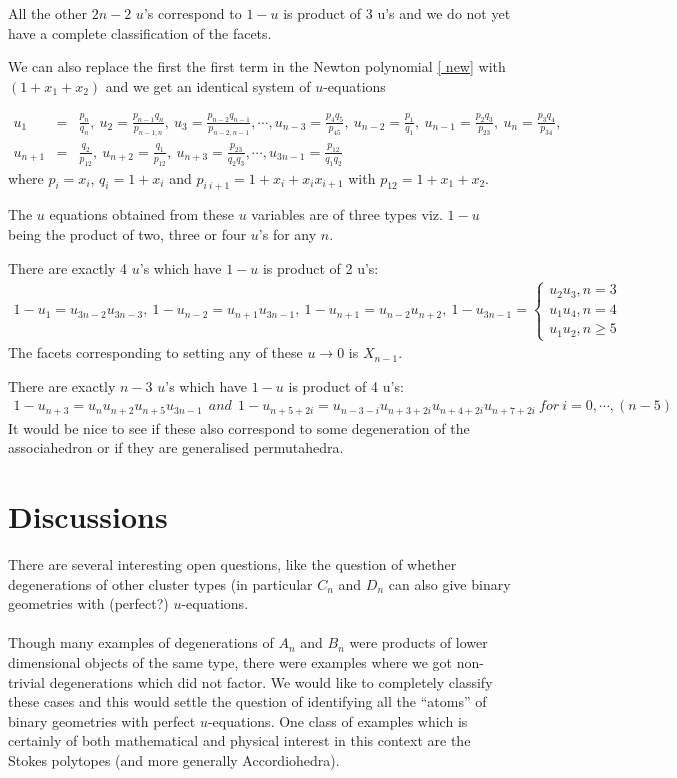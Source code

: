 \documentclass[hidelinks,12pt]{article}
\newcommand{\bea}[1]{\begin{eqnarray}\label{#1} }
\newcommand{\eea}{\end{eqnarray}}
\def\bea{\begin{eqnarray}}
\def\eea{\end{eqnarray}}
\begin{document}
All the other $2n-2$ $u$'s correspond to $1-u$ is product of 3 u's and we do not yet have a complete classification of the facets.

We can also replace the first the first term in the Newton polynomial \eqref{ new} with $(1+x_1+ x_2)$ and we get an identical system of $u$-equations

\bea
u_1 &=& \frac{p_n}{q_n}, ~u_2 = \frac{p_{n-1}q_n}{p_{n-1,n}},~u_3 = \frac{p_{n-2}q_{n-1}}{p_{n-2,n-1}}, \cdots,
u_{n-3} = \frac{p_4 q_5}{p_{45}}, ~u_{n-2} = \frac{p_{1}}{q_{1}},~u_{n-1} = \frac{p_{2}q_{3}}{p_{23}},~u_{n} = \frac{p_{3}q_{4}}{p_{34}}, \nonumber \\
u_{n+1} &=& \frac{q_2}{p_{12}}, ~u_{n+2} = \frac{q_{1}}{p_{12}},~u_{n+3} = \frac{p_{23}}{q_{2}q_{3}}, \cdots,
u_{3n-1} = \frac{ p_{12}}{q_{1}q_{2}} \nonumber
\eea
where $p_i =x_i$, $q_i= 1+x_i$ and $p_{i~i+1}=1+x_i+ x_i x_{i+1}$ with $p_{12}= 1+x_1+x_2$.

The $u$ equations obtained from these $u$ variables are of three types viz. $1-u$ being the product of two, three or four $u$'s  for any $n$.  

There are exactly 4 $u$'s which have $1-u$ is product of 2 u's:
\bea
1-u_{1} =u_{3n-2} u_{3n-3},~
1-u_{n-2} =u_{n+1} u_{3n-1},~
1-u_{n+1} =u_{n-2} u_{n+2},~
1-u_{3n-1} = \begin{cases}
u_{2} u_{3} , n=3\\
u_{1} u_{4} , n=4\\
u_{1} u_{2} , n\geq 5
\end{cases} \nonumber 
\eea
The facets corresponding to setting any of these $u \to 0$ is $X_{n-1}$.

There are exactly $n-3$ $u$'s which have $1-u$ is product of 4 u's:
\bea
1-u_{n+3} =u_{n} u_{n+2}u_{n+5} u_{3n-1} ~~and~~
1-u_{n+5+ 2 i} =u_{n-3-i} u_{n+3+2 i} u_{n+4+2 i} u_{n+7+2 i}~ for~i=0,\cdots,(n-5) \nonumber 
\eea
It would be nice to see if these also correspond to some degeneration of the associahedron or if they  are generalised permutahedra. 



\newpage
\section{Discussions}
There are several interesting open questions, like the question of  whether degenerations of other cluster types (in particular $C_n$ and $D_n$ can also give binary geometries with (perfect?) $u$-equations.\\\\
\noindent
Though many examples of degenerations of $A_n$ and $B_n$ were products of lower dimensional objects of the same type, there were examples where we got non-trivial degenerations which did not factor. We would like to completely classify these cases and this would settle the question of identifying all the ``atoms'' of binary geometries with perfect $u$-equations. One class of examples which is certainly of both mathematical and physical interest in this context are the Stokes polytopes (and more generally Accordiohedra).
\end{document}
